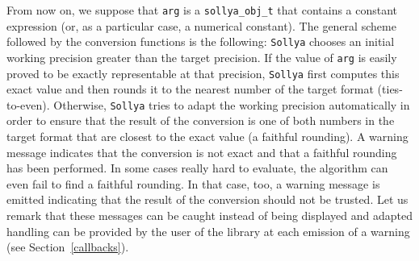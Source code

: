 \documentclass[a4paper]{article}
\newcommand{\sollya}{\texttt{Sollya}\xspace}
\begin{document}
From now on, we suppose that \verb|arg| is a \verb|sollya_obj_t| that contains a constant expression (or, as a particular case, a numerical constant). The general scheme followed by the conversion functions is the following: \sollya chooses an initial working precision greater than the target precision. If the value of \verb|arg| is easily proved to be exactly representable at that precision, \sollya first computes this exact value and then rounds it to the nearest number of the target format (ties-to-even). Otherwise, \sollya tries to adapt the working precision automatically in order to ensure that the result of the conversion is one of both numbers in the target format that are closest to the exact value (a faithful rounding). A warning message indicates that the conversion is not exact and that a faithful rounding has been performed. In some cases really hard to evaluate, the algorithm can even fail to find a faithful rounding. In that case, too, a warning message is emitted indicating that the result of the conversion should not be trusted. Let us remark that these messages can be caught instead of being displayed and adapted handling can be provided by the user of the library at each emission of a warning (see Section~\ref{callbacks}).
\end{document}
